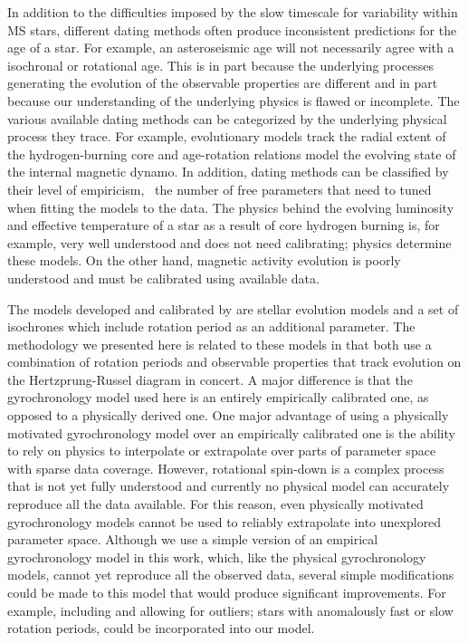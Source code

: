 In addition to the difficulties imposed by the slow timescale for variability
within MS stars, different dating methods often produce inconsistent
predictions for the age of a star.
For example, an asteroseismic age will not necessarily agree with a isochronal
or rotational age.
This is in part because the underlying processes generating the evolution of
the observable properties are different and in part because our understanding
of the underlying physics is flawed or incomplete.
The various available dating methods can be categorized by the underlying
physical process they trace.
For example, evolutionary models track the radial extent of the
hydrogen-burning core and age-rotation relations model the evolving state of
the internal magnetic dynamo.
In addition, dating methods can be classified by their level of empiricism,
\ie\ the number of free parameters that need to tuned when fitting the models
to the data.
The physics behind the evolving luminosity and effective temperature of a star
as a result of core hydrogen burning is, for example, very well understood and
does not need calibrating; physics determine these models.
On the other hand, magnetic activity evolution is poorly understood and must
be calibrated using available data.

The models developed and calibrated by \citet{epstein2014, vansaders2015,
vansaders2016} are stellar evolution models and a set of isochrones  which
include rotation period as an additional parameter.
The methodology we presented here is related to these models in that both use
a combination of rotation periods and observable properties that track
evolution on the Hertzprung-Russel diagram in concert.
A major difference is that the gyrochronology model used here is an entirely
empirically calibrated one, as opposed to a physically derived one.
One major advantage of using a physically motivated gyrochronology model over
an empirically calibrated one is the ability to rely on physics to interpolate
or extrapolate over parts of parameter space with sparse data coverage.
However, rotational spin-down is a complex process that is not yet fully
understood and currently no physical model can accurately reproduce all the
data available.
For this reason, even physically motivated gyrochronology models cannot be
used to reliably extrapolate into unexplored parameter space.
Although we use a simple version of an empirical gyrochronology model in this
work, which, like the physical gyrochronology models, cannot yet reproduce all
the observed data, several simple modifications could be made to this model
that would produce significant improvements.
For example, including and allowing for outliers; stars with anomalously fast
or slow rotation periods, could be incorporated into our model.

